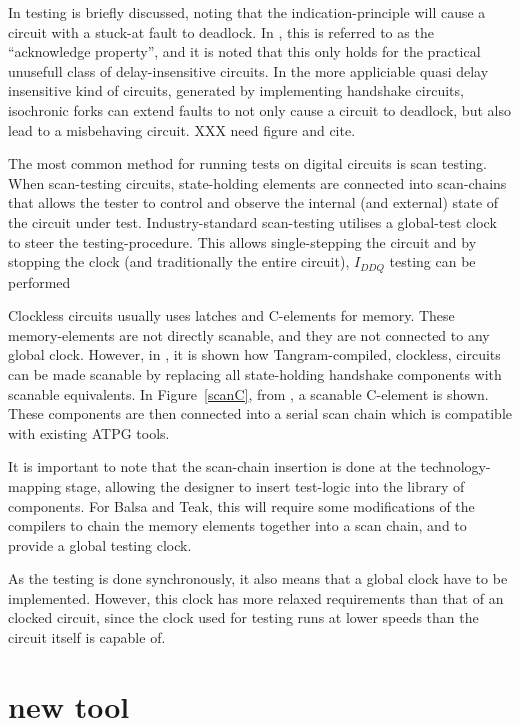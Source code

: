 In \cite[pp. 27-28]{sparso} testing is briefly discussed, noting that
the indication-principle will cause a circuit with a stuck-at fault to
deadlock. In \cite[pp. 26]{fullscan}, this is referred to as the
``acknowledge property'', and it is noted that this only holds for the
practical unusefull class of delay-insensitive circuits. In the more
appliciable quasi delay insensitive kind of circuits, generated by
implementing handshake circuits, isochronic forks can extend faults to
not only cause a circuit to deadlock, but also lead to a misbehaving
circuit. XXX need figure and cite.

The most common method for running tests on digital circuits is
scan testing. When scan-testing circuits, state-holding elements are
connected into scan-chains that allows the tester to control and
observe the internal (and external) state of the circuit under
test. Industry-standard scan-testing utilises a global-test clock to
steer the testing-procedure. This allows single-stepping the circuit
and by stopping the clock (and traditionally the entire circuit),
$I_{DDQ}$ testing can be performed

Clockless circuits usually uses latches and C-elements for
memory. These memory-elements are not directly scanable, and they are
not connected to any global clock. However, in \cite{fullscan}, it is
shown how Tangram-compiled, clockless, circuits can be made scanable
by replacing all state-holding handshake components with scanable
equivalents. In Figure~\ref{scanC}, from \cite{fullscan}, a scanable
C-element is shown. These components are then connected into a serial
scan chain which is compatible with existing ATPG tools.

It is important to note that the scan-chain insertion is done at the
technology-mapping stage, allowing the designer to insert test-logic
into the library of components. For Balsa and Teak, this will require
some modifications of the compilers to chain the memory elements
together into a scan chain, and to provide a global testing clock.

As the testing is done synchronously, it also means that a global
clock have to be implemented. However, this clock has more relaxed
requirements than that of an clocked circuit, since the clock used for
testing runs at lower speeds than the circuit itself is capable of.

\section{new tool}

